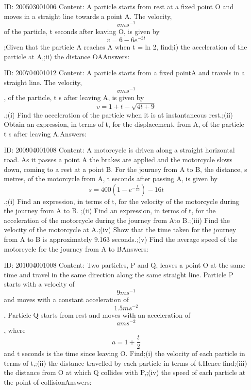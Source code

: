 \documentclass{article}
\begin{document}
ID: 200503001006
Content:
A particle starts from rest at a fixed point O and moves in a straight line towards a point A. The velocity, \[v m s^{-1}\] of the particle, t seconds after leaving O, is given by $$v=6-6e^{-3t}$$;Given that the particle A reaches A when t = ln 2, find;i) the acceleration of the particle at A,;ii) the distance OAAnswers:

ID: 200704001012
Content:
A particle starts from a fixed pointA and travels in a straight line. The velocity, $$vms^{-1}$$, of the particle, t s after leaving A, is given by $$v=1+t-\sqrt{4t+9}$$.;(i)	Find the acceleration of the particle when it is at instantaneous rest.;(ii) Obtain an expression, in terms of t, for the displacement, from A, of the particle t s after leaving A.Answers:

ID: 200904001008
Content:
A motorcycle is driven along a straight horizontal road. As it passes a point A the brakes are applied and the motorcycle slows down, coming to a rest at a point B. For the journey from A to B, the distance, s metres, of the motorcycle from A, t seconds after passing A, is given by $$s =400(1-e^{-\frac{t}{10}})-16t$$.;(i) Find an expression, in terms of t, for the velocity of the motorcycle during the journey from A to B. ;(ii) Find an expression, in terms of t, for the acceleration of the motorcycle during the journey from Ato B.;(iii) Find the velocity of the motorcycle at A.;(iv) Show that the time taken for the journey from A to B is approximately 9.163 seconds.;(v) Find the average speed of the motorcycle for the journey from A to BAnswers:

ID: 201004001008
Content:
Two particles, P and Q, leaves a point O at the same time and travel in the same direction along the same straight line. Particle P starts with a velocity of $$9 ms^{-1}$$ and moves with a constant acceleration of $$1.5 ms^{-2}$$. Particle Q starts from rest and moves with an acceleration of $$a ms^{-2}$$, where $$a=1+\frac{t}{2}$$ and t seconds is the time since leaving O. Find;(i) the velocity of each particle in terms of t,;(ii) the distance travelled by each particle in terms of t.Hence find;(iii) the distance from O at which Q collides with P,;(iv) the speed of each particle at the point of collisionAnswers:
\end{document}
